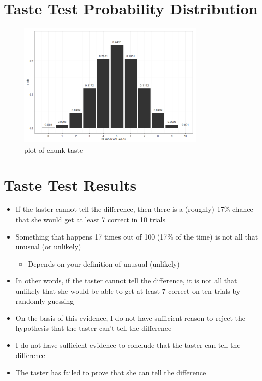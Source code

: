 \documentclass[12pt]{article}
\begin{document}
\section{Taste Test Probability
Distribution}\label{taste-test-probability-distribution}

\begin{figure}[H]
\centering
\includegraphics[width=3.5in]{figure/taste-1.png}
\caption{plot of chunk taste}
\end{figure}

\section{Taste Test Results}\label{taste-test-results-1}

\begin{itemize}
\itemsep1pt\parskip0pt
\item
  If the taster cannot tell the difference, then there is a (roughly)
  17\% chance that she would get at least 7 correct in 10 trials
\item
  Something that happens 17 times out of 100 (17\% of the time) is not
  all that unusual (or unlikely)

  \begin{itemize}
  \itemsep1pt\parskip0pt
  \item
    Depends on your definition of unusual (unlikely)
  \end{itemize}
\item
  In other words, if the taster cannot tell the difference, it is not
  all that unlikely that she would be able to get at least 7 correct on
  ten trials by randomly guessing
\item
  On the basis of this evidence, I do not have sufficient reason to
  reject the hypothesis that the taster can't tell the difference
\item
  I do not have sufficient evidence to conclude that the taster can tell
  the difference
\item
  The taster has failed to prove that she can tell the difference
\end{itemize}
\end{document}
